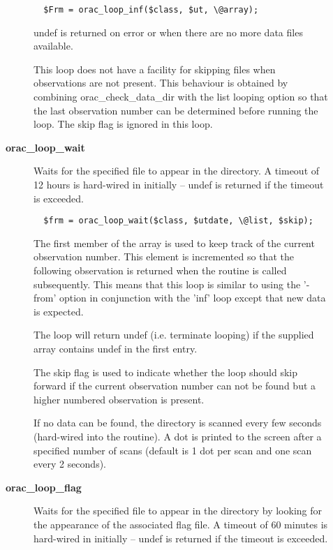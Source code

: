 \begin{description}
\begin{description}
\begin{verbatim}
  $Frm = orac_loop_inf($class, $ut, \@array);
\end{verbatim}


undef is returned on error or when there are no more data files
available.



This loop does not have a facility for skipping files when observations
are not present. This behaviour is obtained by combining
orac\_check\_data\_dir with the list looping option so that the last
observation number can be determined before running the loop. The skip
flag is ignored in this loop.


\item[{\textbf{orac\_loop\_wait}}] \mbox{}

Waits for the specified file to appear in the directory.
A timeout of 12 hours is hard-wired in initially -- undef
is returned if the timeout is exceeded.

\begin{verbatim}
  $frm = orac_loop_wait($class, $utdate, \@list, $skip);
\end{verbatim}


The first member of the array is used to keep track of the
current observation number. This element is incremented so that
the following observation is returned when the routine is called
subsequently. This means that this loop is similar to using the
'-from' option in conjunction with the 'inf' loop except that
new data is expected.



The loop will return undef (i.e. terminate looping) if the
supplied array contains undef in the first entry.



The skip flag is used to indicate whether the loop should skip
forward if the current observation number can not be found
but a higher numbered observation is present.



If no data can be found, the directory is scanned every few seconds
(hard-wired into the routine). A dot is printed to the screen after
a specified number of scans (default is 1 dot per scan and one scan every
2 seconds).


\item[{\textbf{orac\_loop\_flag}}] \mbox{}

Waits for the specified file to appear in the directory
by looking for the appearance of the associated flag file.
A timeout of 60 minutes is hard-wired in initially -- undef
is returned if the timeout is exceeded.


\end{description}
\end{description}
